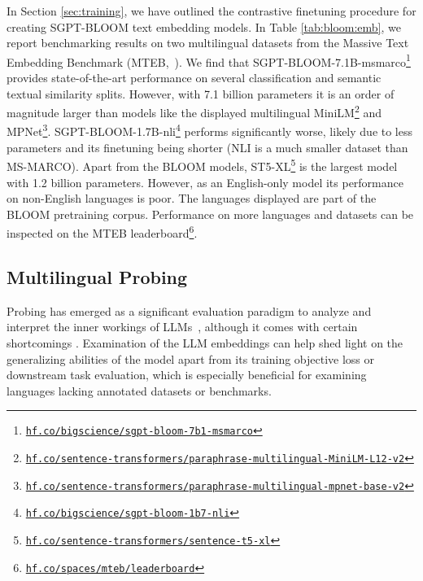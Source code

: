 In Section \ref{sec:training}, we have outlined the contrastive finetuning procedure for creating SGPT-BLOOM text embedding models. In Table \ref{tab:bloom:emb}, we report benchmarking results on two multilingual datasets from the Massive Text Embedding Benchmark (MTEB,~\citealp{muennighoff2022mteb}). We find that SGPT-BLOOM-7.1B-msmarco\footnote{\href{https://hf.co/bigscience/sgpt-bloom-7b1-msmarco}{\texttt{hf.co/bigscience/sgpt-bloom-7b1-msmarco}}} provides state-of-the-art performance on several classification and semantic textual similarity splits. However, with 7.1 billion parameters it is an order of magnitude larger than models like the displayed multilingual MiniLM\footnote{\href{https://hf.co/sentence-transformers/paraphrase-multilingual-MiniLM-L12-v2}{\texttt{hf.co/sentence-transformers/paraphrase-multilingual-MiniLM-L12-v2}}} and MPNet\footnote{\href{https://hf.co/sentence-transformers/paraphrase-multilingual-mpnet-base-v2}{\texttt{hf.co/sentence-transformers/paraphrase-multilingual-mpnet-base-v2}}}. SGPT-BLOOM-1.7B-nli\footnote{\href{https://hf.co/bigscience-data/sgpt-bloom-1b7-nli}{\texttt{hf.co/bigscience/sgpt-bloom-1b7-nli}}} performs significantly worse, likely due to less parameters and its finetuning being shorter (NLI is a much smaller dataset than MS-MARCO). Apart from the BLOOM models, ST5-XL\footnote{\href{https://hf.co/sentence-transformers/sentence-t5-xl}{\texttt{hf.co/sentence-transformers/sentence-t5-xl}}} is the largest model with 1.2 billion parameters. However, as an English-only model its performance on non-English languages is poor. The languages displayed are part of the BLOOM pretraining corpus. Performance on more languages and datasets can be inspected on the MTEB leaderboard\footnote{\href{https://hf.co/spaces/mteb/leaderboard}{\texttt{hf.co/spaces/mteb/leaderboard}}}.

\subsection{Multilingual Probing}
\label{sec:eval:probing}
Probing has emerged as a significant evaluation paradigm to analyze and interpret the inner workings of LLMs~\citep{ettinger-etal-2016-probing,adi:2017:ICLR,belinkov-etal-2017-neural,hupkes2018visualisation,tenney2018you,belinkov-glass-2019-analysis,teehan-etal-2022-emergent}, although it comes with certain shortcomings \citep{belinkov-2022-probing}. Examination of the LLM embeddings can help shed light on the generalizing abilities of the model apart from its training objective loss or downstream task evaluation, which is especially beneficial for examining languages lacking annotated datasets or benchmarks.

